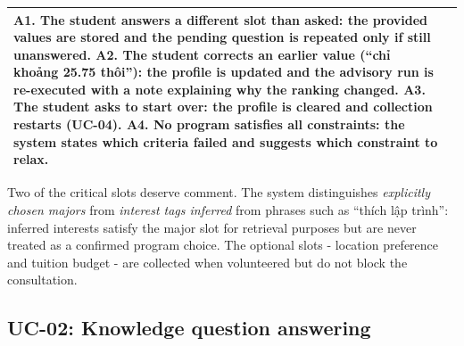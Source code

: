 \documentclass[../main.tex]{subfiles}
\begin{document}
\begin{table}[H]
\begin{tabular}{|p{3.2cm}|p{10.3cm}|}
        A1. The student answers a different slot than asked: the provided values are stored and the pending question is repeated only if still unanswered. \newline
        A2. The student corrects an earlier value (``chỉ khoảng 25.75 thôi''): the profile is updated and the advisory run is re-executed with a note explaining why the ranking changed. \newline
        A3. The student asks to start over: the profile is cleared and collection restarts (UC-04). \newline
        A4. No program satisfies all constraints: the system states which criteria failed and suggests which constraint to relax. \\
        \hline
    \end{tabular}
\end{table}

Two of the critical slots deserve comment.
The system distinguishes \textit{explicitly chosen majors} from \textit{interest tags inferred} from phrases such as ``thích lập trình'': inferred interests satisfy the major slot for retrieval purposes but are never treated as a confirmed program choice.
The optional slots - location preference and tuition budget - are collected when volunteered but do not block the consultation.

\subsection{UC-02: Knowledge question answering}
\end{document}
